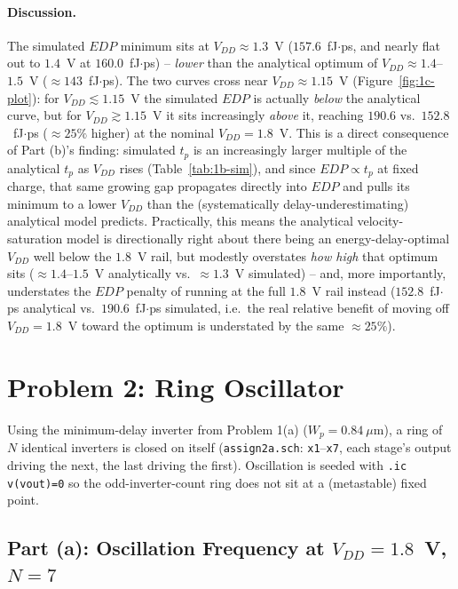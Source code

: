 \paragraph{Discussion.} The simulated $EDP$ minimum sits at
$V_{DD}\approx1.3$~V ($157.6$~fJ$\cdot$ps, and nearly flat out to $1.4$~V at
$160.0$~fJ$\cdot$ps) -- \emph{lower} than the analytical optimum of
$V_{DD}\approx1.4$--$1.5$~V ($\approx143$~fJ$\cdot$ps). The two curves cross
near $V_{DD}\approx1.15$~V (Figure~\ref{fig:1c-plot}): for $V_{DD}\lesssim1.15$~V
the simulated $EDP$ is actually \emph{below} the analytical curve, but for
$V_{DD}\gtrsim1.15$~V it sits increasingly \emph{above} it, reaching $190.6$
vs.\ $152.8$~fJ$\cdot$ps ($\approx25\%$ higher) at the nominal $V_{DD}=1.8$~V.
This is a direct consequence of Part (b)'s finding: simulated $t_p$ is an
increasingly larger multiple of the analytical $t_p$ as $V_{DD}$ rises
(Table~\ref{tab:1b-sim}), and since $EDP\propto t_p$ at fixed charge, that
same growing gap propagates directly into $EDP$ and pulls its minimum to a
lower $V_{DD}$ than the (systematically delay-underestimating) analytical
model predicts. Practically, this means the analytical velocity-saturation
model is directionally right about there being an energy-delay-optimal
$V_{DD}$ well below the $1.8$~V rail, but modestly overstates \emph{how high}
that optimum sits ($\approx1.4$--$1.5$~V analytically vs.\ $\approx1.3$~V
simulated) -- and, more importantly, understates the $EDP$ penalty of running
at the full $1.8$~V rail instead ($152.8$~fJ$\cdot$ps analytical vs.\
$190.6$~fJ$\cdot$ps simulated, i.e.\ the real relative benefit of moving off
$V_{DD}=1.8$~V toward the optimum is understated by the same
$\approx25\%$).

\section{Problem 2: Ring Oscillator}

Using the minimum-delay inverter from Problem 1(a) ($W_p=0.84\ \mu\text{m}$),
a ring of $N$ identical inverters is closed on itself
(\texttt{assign2a.sch}: \texttt{x1}--\texttt{x7}, each stage's output driving
the next, the last driving the first). Oscillation is seeded with
\texttt{.ic v(vout)=0} so the odd-inverter-count ring does not sit at a
(metastable) fixed point.

\subsection{Part (a): Oscillation Frequency at $V_{DD}=1.8$~V, $N=7$}

